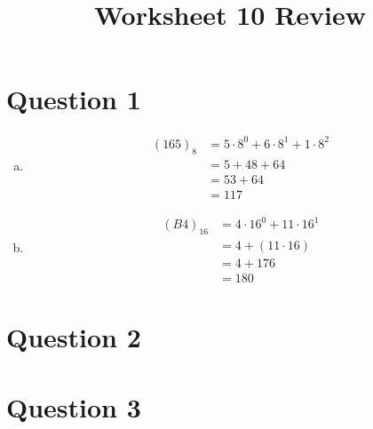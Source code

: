 \documentclass[12pt]{article}
\begin{document}
\title{Worksheet 10 Review}
\maketitle

\section*{Question 1}
\begin{enumerate}[a.]
    \item
    \begin{align}
        (165)_8 &= 5 \cdot 8^0 + 6 \cdot 8^1 + 1 \cdot 8^2\\
        &= 5 + 48 + 64\\
        &= 53 + 64\\
        &= 117
    \end{align}

    \item

    \begin{align}
        (B4)_16 &= 4 \cdot 16^0 + 11 \cdot 16^1\\
        &= 4 + (11 \cdot 16)\\
        &= 4 + 176\\
        &= 180
    \end{align}
\end{enumerate}

\section*{Question 2}

\section*{Question 3}
\end{document}
